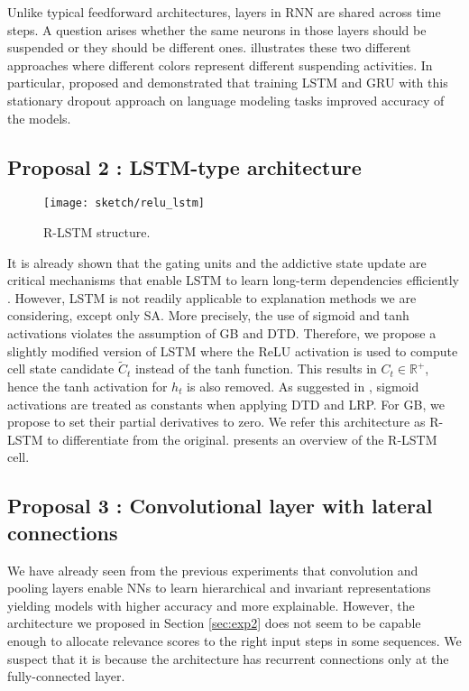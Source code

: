 Unlike typical feedforward architectures, layers in RNN are shared across time steps. A question arises whether the same neurons in those layers should be suspended or they should be different ones. \addfigure{\ref{fig:dropout_lstm}} illustrates these two different approaches where different colors represent different suspending activities. In particular, \citet{GalTheoreticallyGroundedApplication2016} proposed and demonstrated that training LSTM and GRU with this stationary dropout approach on language modeling tasks improved accuracy of the models.


\subsection{Proposal 2 : LSTM-type architecture}
\begin{figure}[!htb]
\centering
\texttt{[image: sketch/relu\_lstm]}
\caption{R-LSTM structure.} 

\label{fig:relu_lstm} 
\end{figure}

It is already shown that the gating units and the addictive state update are critical mechanisms that enable LSTM to learn long-term dependencies efficiently \citep{GreffLSTMsearchspace2017, JozefowiczEmpiricalExplorationRecurrent2015}. However, LSTM is not readily applicable to explanation methods we are considering, except only SA. More precisely, the use of sigmoid and tanh activations violates the assumption of GB and DTD. Therefore, we propose a slightly modified version of LSTM where the ReLU activation is used to compute cell state candidate $\widetilde{C}_t$ instead of the tanh function. This results in $C_t \in \mathbb{R}^+$, hence the tanh activation for $h_t$  is also removed.  As suggested in \citep{ArrasExplainingRecurrentNeural2017},  sigmoid activations are treated as constants when applying DTD and LRP. For GB, we propose to set their partial derivatives to zero. We refer this architecture as R-LSTM to differentiate from the original.  \addfigure{\ref{fig:relu_lstm}} presents an overview of the R-LSTM cell.


\subsection{Proposal 3 : Convolutional layer with lateral connections}
We have already seen from the previous experiments that convolution and pooling layers enable NNs to learn hierarchical and invariant representations yielding models with higher accuracy and more explainable. However, the  architecture we proposed in Section \ref{sec:exp2} does not seem to be capable enough to allocate relevance scores to the right input steps in some sequences. We suspect that it is because the architecture has recurrent connections only at the fully-connected layer.


